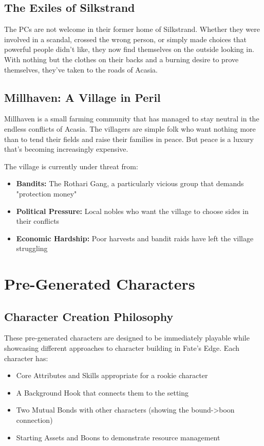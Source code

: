 \documentclass[11pt]{article}
\begin{document}
\subsection{The Exiles of Silkstrand}

The PCs are not welcome in their former home of Silkstrand. Whether they were involved in a scandal, crossed the wrong person, or simply made choices that powerful people didn't like, they now find themselves on the outside looking in. With nothing but the clothes on their backs and a burning desire to prove themselves, they've taken to the roads of Acasia.

\subsection{Millhaven: A Village in Peril}

Millhaven is a small farming community that has managed to stay neutral in the endless conflicts of Acasia. The villagers are simple folk who want nothing more than to tend their fields and raise their families in peace. But peace is a luxury that's becoming increasingly expensive.

The village is currently under threat from:
\begin{itemize}
\item \textbf{Bandits:} The Rothari Gang, a particularly vicious group that demands "protection money"
\item \textbf{Political Pressure:} Local nobles who want the village to choose sides in their conflicts
\item \textbf{Economic Hardship:} Poor harvests and bandit raids have left the village struggling
\end{itemize}

\section{Pre-Generated Characters}

\subsection{Character Creation Philosophy}

These pre-generated characters are designed to be immediately playable while showcasing different approaches to character building in Fate's Edge. Each character has:
\begin{itemize}
\item Core Attributes and Skills appropriate for a rookie character
\item A Background Hook that connects them to the setting
\item Two Mutual Bonds with other characters (showing the bound->boon connection)
\item Starting Assets and Boons to demonstrate resource management
\end{itemize}
\end{document}
